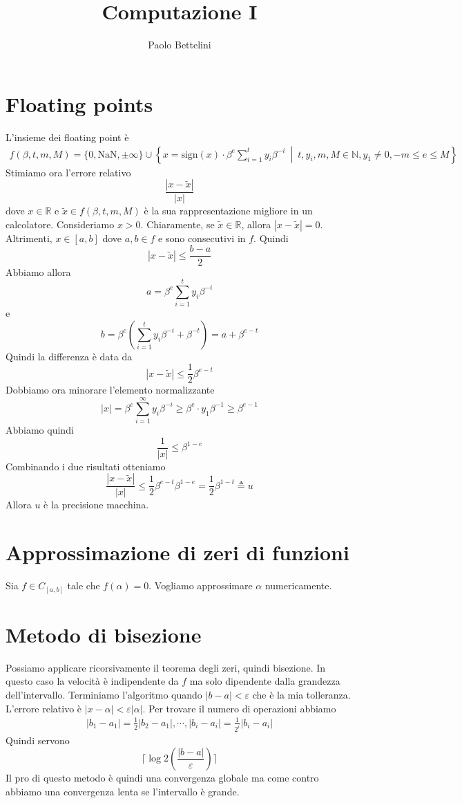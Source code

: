 \documentclass[a4paper]{article}
\title{Computazione I}
\author{Paolo Bettelini}
\date{}
\begin{document}
\maketitle
\tableofcontents

\section{Floating points}

L'insieme dei floating point è
\begin{align*}
    f(\beta, t, m, M) = \{0, \text{NaN}, \pm\infty\} \cup
    \left\{x = \text{sign}(x) \cdot \beta^e \sum_{i=1}^t y_i \beta^{-i} \ \middle|\ 
    t,y_i,m,M \in \mathbb{N}, y_1 \neq 0, -m\leq e \leq M \right\}
\end{align*}
Stimiamo ora l'errore relativo
\[
    \frac{|x-\tilde x|}{|x|}
\]
dove \(x\in\mathbb{R}\) e \(\tilde x \in f(\beta, t, m, M)\) è la sua rappresentazione migliore in un calcolatore.
Consideriamo \(x > 0\).
Chiaramente, se \(\tilde x \in \mathbb{R}\), allora \(|x-\tilde x| = 0\).
Altrimenti, \(x\in [a,b]\) dove \(a,b\in f\) e sono consecutivi in \(f\).
Quindi
\[
    |x-\tilde x| \leq \frac{b-a}{2}
\]
Abbiamo allora
\[
    a = \beta^e \sum_{i=1}^t y_i \beta^{-i}
\]
e
\[
    b = \beta^e \left( \sum_{i=1}^t y_i \beta^{-i} + \beta^{-t} \right)
    = a + \beta^{e - t}
\]
Quindi la differenza è data da
\[
    |x - \tilde x| \leq \frac{1}{2}\beta^{e-t}
\]
Dobbiamo ora minorare l'elemento normalizzante
\[
    |x| = \beta^e \sum_{i=1}^\infty y_i\beta^{-i} \geq \beta^e \cdot y_1 \beta^{-1} \geq \beta^{e-1}
\]
Abbiamo quindi
\[
    \frac{1}{|x|} \leq \beta^{1-e}
\]
Combinando i due risultati otteniamo
\[
    \frac{|x-\tilde x|}{|x|} \leq \frac{1}{2}\beta^{e-t} \beta^{1-e}
    = \frac{1}{2} \beta^{1-t} \triangleq u
\]
Allora \(u\) è la precisione macchina.

\section{Approssimazione di zeri di funzioni}

Sia \(f \in C_{[a,b]}\) tale che \(f(\alpha) = 0\). Vogliamo approssimare \(\alpha\) numericamente.

\section{Metodo di bisezione}

Possiamo applicare ricorsivamente il teorema degli zeri, quindi bisezione.
In questo caso la velocità è indipendente da \(f\) ma solo dipendente dalla grandezza
dell'intervallo. Terminiamo l'algoritmo quando \(|b-a| < \varepsilon\) che è la mia tolleranza.
L'errore relativo è \(|x-\alpha| < \varepsilon|\alpha|\).
Per trovare il numero di operazioni abbiamo
\begin{align*}
    |b_1 - a_1| = \frac{1}{2} |b_2 - a_1|, \cdots, |b_i - a_i| = \frac{1}{2^i}|b_i - a_i|
\end{align*}
Quindi servono
\[
    \lceil \log2 \left(\frac{|b-a|}{\varepsilon}\right) \rceil
\]
Il pro di questo metodo è quindi una convergenza globale ma come contro
abbiamo una convergenza lenta se l'intervallo è grande.
\end{document}
